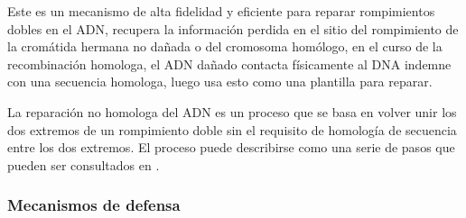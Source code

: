 Este es un mecanismo de alta fidelidad y eficiente para reparar rompimientos dobles en el ADN, recupera la información perdida en el sitio del rompimiento de la cromátida hermana no dañada o del cromosoma homólogo, en el curso de la recombinación homologa, el ADN dañado contacta físicamente al DNA indemne con una secuencia homologa, luego usa esto como una plantilla para reparar\cite{rescells}.


La reparación no homologa del ADN  es un proceso que se basa en volver unir los dos extremos de un rompimiento doble sin el requisito de homología de secuencia entre los dos extremos. El proceso puede describirse como una serie de pasos que pueden ser consultados en \cite{rescells}.






\subsubsection{Mecanismos de defensa}
